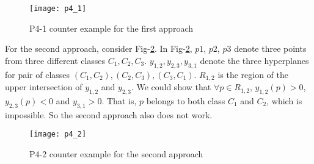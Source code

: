 \documentclass[12pt]{article}
\begin{document}
\begin{figure}[ht!]
  \centering
  \texttt{[image: p4\_1]}
  \caption{P4-1 counter example for the first approach \label{fig:p4_1}}
\end{figure}

For the second approach, consider Fig-\ref{fig:p4_2}. In Fig-\ref{fig:p4_2}, $p1$, $p2$, $p3$ denote three points from three different classes $C_1, C_2, C_3$. $y_{1,2}, y_{2,3}, y_{3,1}$ denote the three hyperplanes for pair of classes $(C_1, C_2), (C_2, C_3), (C_3,C_1)$. $R_{1,2}$ is the region of the upper intersection of $y_{1,2}$ and $y_{2,3}$. We could show that $\forall p \in R_{1,2}$, $y_{1,2}(p) > 0$, $y_{2,3}(p) < 0$ and $y_{3,1} > 0$. That is, $p$ belongs to both class $C_1$ and $C_2$, which is impossible. So the second approach also does not work.

\begin{figure}[ht!]
  \centering
  \texttt{[image: p4\_2]}
  \caption{P4-2 counter example for the second approach \label{fig:p4_2}}
\end{figure}
\end{document}
